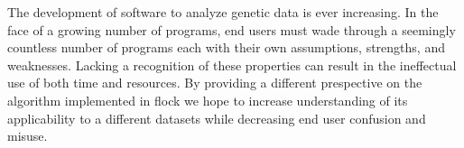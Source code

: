 The development of software to analyze genetic data is ever increasing. In the face of a growing
number of programs, end users must wade through a seemingly countless number of programs each with
their own assumptions, strengths, and weaknesses. Lacking a recognition of these properties
can result in the ineffectual use of both time and resources.
By providing a different prespective on the algorithm
implemented in {\sc flock} we hope to increase understanding of its applicability to a different datasets
while decreasing end user confusion and misuse. 



 
